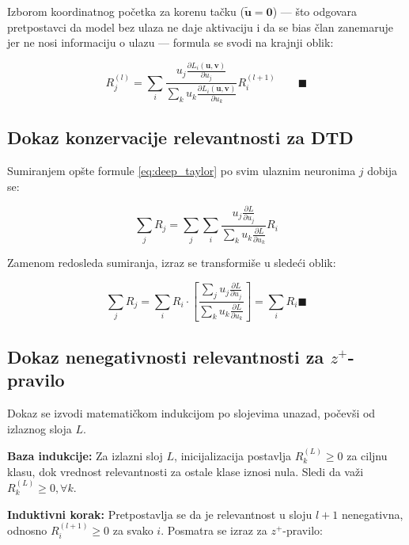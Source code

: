 Izborom koordinatnog početka za korenu tačku ($\tilde{\mathbf{u}} = \mathbf{0}$) — što odgovara pretpostavci da model bez ulaza ne daje aktivaciju i da se bias član zanemaruje jer ne nosi informaciju o ulazu — formula se svodi na krajnji oblik:

\begin{equation*}
    R_j^{(l)} = \sum_i \frac{u_j \frac{\partial L_i(\mathbf{u}, \mathbf{v})}{\partial u_j}}{\sum_k u_k \frac{\partial L_i(\mathbf{u}, \mathbf{v})}{\partial u_k}} R_i^{(l+1)} \qquad \blacksquare
\end{equation*}

\subsection{Dokaz konzervacije relevantnosti za DTD}
\label{appendix:conservation}

Sumiranjem opšte formule \eqref{eq:deep_taylor} po svim ulaznim neuronima $j$ dobija se:

\begin{equation*}
    \sum_j R_j = \sum_j \sum_i 
    \frac{u_j \frac{\partial L}{\partial u_j}}
    {\sum_k u_k \frac{\partial L}{\partial u_k}} R_i
\end{equation*}

Zamenom redosleda sumiranja, izraz se transformiše u sledeći oblik:

\begin{equation*}
    \sum_j R_j = \sum_i R_i \cdot \left[ \frac{\sum_j u_j \frac{\partial L}{\partial u_j}}{\sum_k u_k \frac{\partial L}{\partial u_k}} \right] = \sum_i R_i
    \blacksquare
\end{equation*}

\subsection{Dokaz nenegativnosti relevantnosti za $z^+$-pravilo}
\label{appendix:positive}

Dokaz se izvodi matematičkom indukcijom po slojevima unazad, počevši od izlaznog sloja $L$.

\textbf{Baza indukcije:} Za izlazni sloj $L$, inicijalizacija postavlja $R_k^{(L)} \ge 0$ za ciljnu klasu, dok vrednost relevantnosti za ostale klase iznosi nula. Sledi da važi $R_k^{(L)} \ge 0, \forall k$.

\textbf{Induktivni korak:} Pretpostavlja se da je relevantnost u sloju $l+1$ nenegativna, odnosno $R_i^{(l+1)} \ge 0$ za svako $i$. Posmatra se izraz za $z^+$-pravilo:

